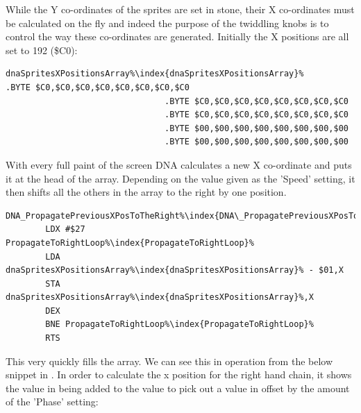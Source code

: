 While the Y co-ordinates of the sprites are set in stone, their X co-ordinates must be calculated on the fly
and indeed the purpose of the twiddling knobs is to control the way these co-ordinates are generated. Initially
the X positions are all set to 192 (\$C0):

\begin{lstlisting}[escapechar=\%]
dnaSpritesXPositionsArray%\index{dnaSpritesXPositionsArray}%       .BYTE $C0,$C0,$C0,$C0,$C0,$C0,$C0,$C0
                                .BYTE $C0,$C0,$C0,$C0,$C0,$C0,$C0,$C0
                                .BYTE $C0,$C0,$C0,$C0,$C0,$C0,$C0,$C0
                                .BYTE $00,$00,$00,$00,$00,$00,$00,$00
                                .BYTE $00,$00,$00,$00,$00,$00,$00,$00
\end{lstlisting}

With every full paint of the screen DNA calculates a new X co-ordinate and puts it at the head of the array. Depending
on the value given as the 'Speed' setting, it then shifts all the others in the array to the right by one position. 

\begin{lstlisting}[escapechar=\%]
DNA_PropagatePreviousXPosToTheRight%\index{DNA\_PropagatePreviousXPosToTheRight}%
        LDX #$27
PropagateToRightLoop%\index{PropagateToRightLoop}%   
        LDA dnaSpritesXPositionsArray%\index{dnaSpritesXPositionsArray}% - $01,X
        STA dnaSpritesXPositionsArray%\index{dnaSpritesXPositionsArray}%,X
        DEX
        BNE PropagateToRightLoop%\index{PropagateToRightLoop}%
        RTS
\end{lstlisting}

This very quickly fills the array.  We can see this in operation from the below
snippet in . In order to calculate the x position
for the right hand chain, it shows the value in
 being added to the value
 to pick out a value in
 offset by the amount of the 'Phase' setting:

